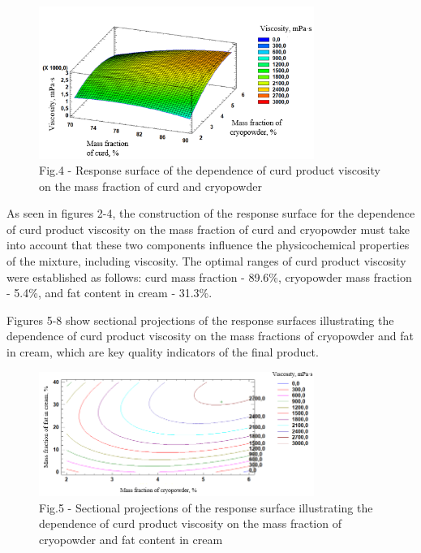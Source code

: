 \begin{figure}[H]
	\centering
	\includegraphics[width=0.8\textwidth]{media/pish2/image84}
	\caption*{Fig.4 - Response surface of the dependence of curd product viscosity on the mass fraction of curd and cryopowder}
\end{figure}

\begin{multicols}{2}
As seen in figures 2-4, the construction of the response surface for the
dependence of curd product viscosity on the mass fraction of curd and
cryopowder must take into account that these two components influence
the physicochemical properties of the mixture, including viscosity. The
optimal ranges of curd product viscosity were established as follows:
curd mass fraction - 89.6\%, cryopowder mass fraction - 5.4\%, and fat
content in cream - 31.3\%.

Figures 5-8 show sectional projections of the response surfaces
illustrating the dependence of curd product viscosity on the mass
fractions of cryopowder and fat in cream, which are key quality
indicators of the final product.
\end{multicols}

\begin{figure}[H]
	\centering
	\includegraphics[width=0.8\textwidth]{media/pish2/image85}
	\caption*{Fig.5 - Sectional projections of the response surface illustrating the dependence of curd product viscosity on the mass fraction of cryopowder and fat content in cream}
\end{figure}

